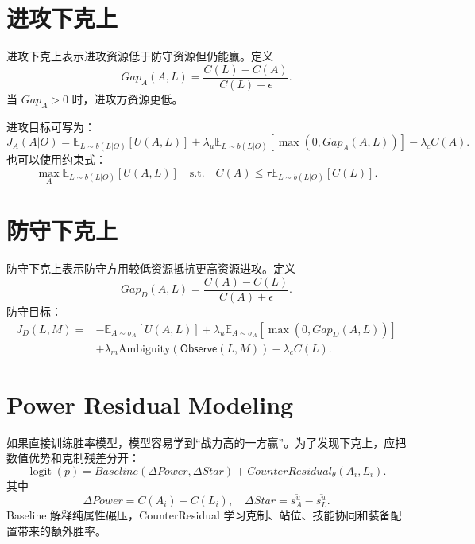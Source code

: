 \documentclass[UTF8,12pt,openany]{ctexbook}
\newcommand{\Observe}{\mathsf{Observe}}
\newcommand{\logit}{\operatorname{logit}}
\newcommand{\E}{\mathbb{E}}
\begin{document}
\section{进攻下克上}
进攻下克上表示进攻资源低于防守资源但仍能赢。定义
\begin{equation}
Gap_A(A,L)=\frac{C(L)-C(A)}{C(L)+\epsilon}.
\end{equation}
当 $Gap_A>0$ 时，进攻方资源更低。

进攻目标可写为：
\begin{equation}
J_A(A|O)=\E_{L\sim b(L|O)}[U(A,L)]+\lambda_u\E_{L\sim b(L|O)}[\max(0,Gap_A(A,L))]-\lambda_c C(A).
\end{equation}
也可以使用约束式：
\begin{equation}
\max_A\E_{L\sim b(L|O)}[U(A,L)]\quad \text{s.t.}\quad C(A)\le \tau\E_{L\sim b(L|O)}[C(L)].
\end{equation}

\section{防守下克上}
防守下克上表示防守方用较低资源抵抗更高资源进攻。定义
\begin{equation}
Gap_D(A,L)=\frac{C(A)-C(L)}{C(A)+\epsilon}.
\end{equation}
防守目标：
\begin{equation}
\begin{aligned}
J_D(L,M)=&-\E_{A\sim\sigma_A}[U(A,L)]
+\lambda_u\E_{A\sim\sigma_A}[\max(0,Gap_D(A,L))]\\
&+\lambda_m \mathrm{Ambiguity}(\Observe(L,M))-\lambda_c C(L).
\end{aligned}
\end{equation}

\section{Power Residual Modeling}
如果直接训练胜率模型，模型容易学到“战力高的一方赢”。为了发现下克上，应把数值优势和克制残差分开：
\begin{equation}
\logit(p)=Baseline(\Delta Power,\Delta Star)+CounterResidual_\theta(A_i,L_i).
\end{equation}
其中
\begin{equation}
\Delta Power=C(A_i)-C(L_i),\quad \Delta Star=\overline{s^u_A}-\overline{s^u_L}.
\end{equation}
Baseline 解释纯属性碾压，CounterResidual 学习克制、站位、技能协同和装备配置带来的额外胜率。
\end{document}
